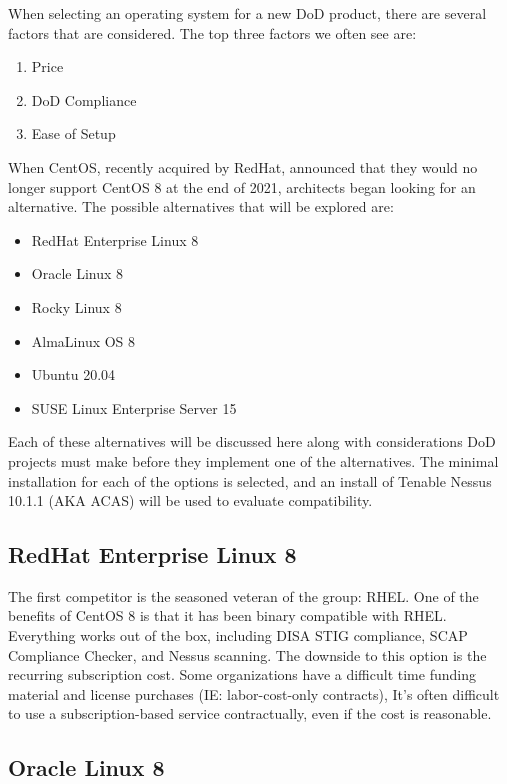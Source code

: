When selecting an operating system for a new DoD product, there are several factors that are considered. The top three factors we often see are:
\begin{enumerate}
	\item Price
	\item DoD Compliance
	\item Ease of Setup
\end{enumerate}

When CentOS, recently acquired by RedHat, announced that they would no longer support CentOS 8 at the end of 2021,\autocite{20220321:centos-eol} architects began looking for an alternative. The possible alternatives that will be explored are:
\begin{itemize}
	\item RedHat Enterprise Linux 8
	\item Oracle Linux 8
	\item Rocky Linux 8
	\item AlmaLinux OS 8
	\item Ubuntu 20.04
	\item SUSE Linux Enterprise Server 15
\end{itemize}

Each of these alternatives will be discussed here along with considerations DoD projects must make before they implement one of the alternatives. The minimal installation for each of the options is selected, and an install of Tenable Nessus 10.1.1 (AKA ACAS) will be used to evaluate compatibility.

\subsection{RedHat Enterprise Linux 8}

The first competitor is the seasoned veteran of the group: RHEL. One of the benefits of CentOS 8 is that it has been binary compatible with RHEL. Everything works out of the box, including DISA STIG compliance, SCAP Compliance Checker, and Nessus scanning. The downside to this option is the recurring subscription cost. Some organizations have a difficult time funding material and license purchases (IE: labor-cost-only contracts), It's often difficult to use a subscription-based service contractually, even if the cost is reasonable.

\subsection{Oracle Linux 8}

